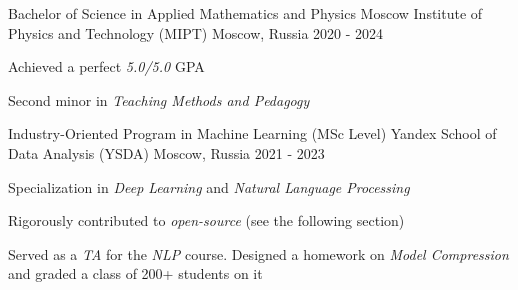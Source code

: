 
\begin{cventries}
  \cventry
    {Bachelor of Science in Applied Mathematics and Physics} %
    {Moscow Institute of Physics and Technology (MIPT)} %
    {Moscow, Russia} %
    {2020 - 2024} %
    {
        \begin{cvitems}
         \item { Achieved a perfect \textit{5.0/5.0} GPA }
         \item { Second minor in \textit{Teaching Methods and Pedagogy} }
        \end{cvitems}
    }
    
  \cventry
    {Industry-Oriented Program in Machine Learning (MSc Level) } %
    {Yandex School of Data Analysis (YSDA)}
    {Moscow, Russia}
    {2021 - 2023}
    {
      \begin{cvitems} %
        \item { Specialization in \textit{Deep Learning} and \textit{Natural Language Processing} }
        \item { Rigorously contributed to \textit{open-source} (see the following section)}
        \item { Served as a \textit{TA} for the \textit{NLP} course. Designed a homework on \textit{Model Compression} and graded a class of 200+ students on it }
      \end{cvitems}
    }
\end{cventries}
